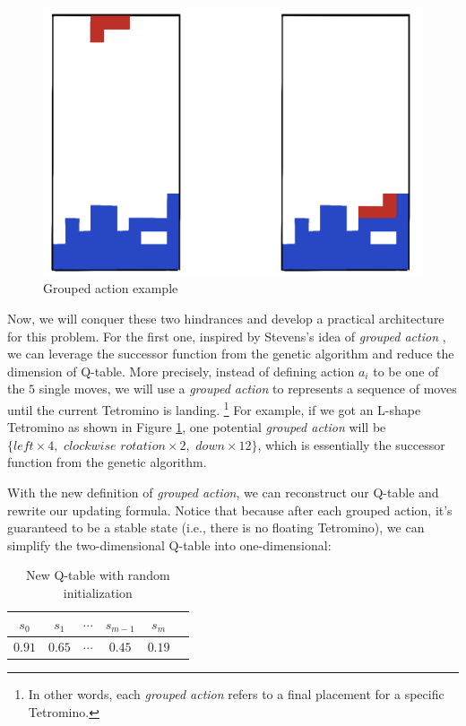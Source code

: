 \documentclass[letterpaper]{article} %
\begin{document}
\begin{figure}[h!]
  \centering
  \includegraphics[width=0.9\linewidth]{figures/group_actions.jpeg}
  \caption{Grouped action example}
  \label{fig:grouped_action}
\end{figure}

Now, we will conquer these two hindrances and develop a practical architecture for this problem. For the first one, inspired by Stevens's idea of \textit{grouped action} \cite{Stevens_2016}, we can leverage the successor function from the genetic algorithm and reduce the dimension of Q-table. More precisely, instead of defining action $a_i$ to be one of the $5$ single moves, we will use a \textit{grouped action} to represents a sequence of moves until the current Tetromino is landing. \footnote{In other words, each \textit{grouped action} refers to a final placement for a specific Tetromino.} For example, if we got an L-shape Tetromino as shown in Figure \ref{fig:grouped_action}, one potential \textit{grouped action} will be $\{left\times 4, \,\,clockwise\,\,rotation \times 2,\,\,down\times 12\}$, which is essentially the successor function from the genetic algorithm.


With the new definition of \textit{grouped action}, we can reconstruct our Q-table and rewrite our updating formula. Notice that because after each grouped action, it's guaranteed to be a stable state (i.e., there is no floating Tetromino), we can simplify the two-dimensional Q-table into one-dimensional:

\begin{table}[h!]
  \centering
  \normalsize{
    \begin{tabular}{ |c|c|c|c|c|c| } 
      \hline
      $s_{0}$ & $s_{1}$ & $\cdots$ & $s_{m-1}$ & $s_{m}$  \\ 
      \hline
      $0.91$ & $0.65$ &$\cdots $ &$0.45$ &$0.19$  \\ 
       \hline
      \end{tabular}}
  \caption{New Q-table with random initialization}
  \label{tab:qtbale}
\end{table}
\end{document}
